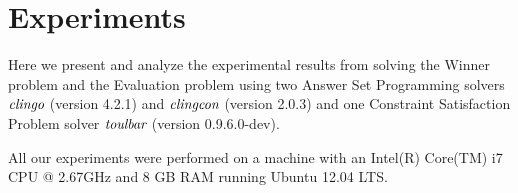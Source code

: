
\section{Experiments}
Here we present and analyze the experimental results from solving the Winner problem
and the Evaluation problem using two Answer Set Programming solvers
$\textit{clingo}$ (version 4.2.1) and $\textit{clingcon}$ (version 2.0.3)
and one Constraint Satisfaction Problem solver $\textit{toulbar}$ (version 0.9.6.0-dev).

All our experiments were performed on a machine with an 
Intel(R) Core(TM) i7 CPU @ 2.67GHz and 8 GB RAM running 
Ubuntu 12.04 LTS.  

